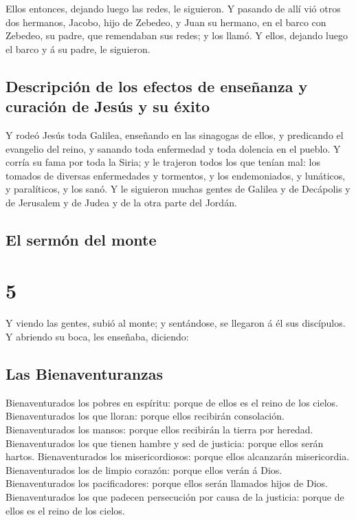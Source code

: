  Ellos entonces, dejando luego las redes, le siguieron.
 Y pasando de allí vió otros dos hermanos, Jacobo, hijo de
Zebedeo, y Juan su hermano, en el barco con Zebedeo, su padre, que
remendaban sus redes; y los llamó.  Y ellos, dejando luego
el barco y á su padre, le siguieron.

\hypertarget{descripciuxf3n-de-los-efectos-de-enseuxf1anza-y-curaciuxf3n-de-jesuxfas-y-su-uxe9xito}{%
\subsection{Descripción de los efectos de enseñanza y curación de Jesús
y su
éxito}\label{descripciuxf3n-de-los-efectos-de-enseuxf1anza-y-curaciuxf3n-de-jesuxfas-y-su-uxe9xito}}

 Y rodeó Jesús toda Galilea, enseñando en las sinagogas de
ellos, y predicando el evangelio del reino, y sanando toda enfermedad y
toda dolencia en el pueblo.  Y corría su fama por toda la
Siria; y le trajeron todos los que tenían mal: los tomados de diversas
enfermedades y tormentos, y los endemoniados, y lunáticos, y
paralíticos, y los sanó.  Y le siguieron muchas gentes de
Galilea y de Decápolis y de Jerusalem y de Judea y de la otra parte del
Jordán.

\hypertarget{el-sermuxf3n-del-monte}{%
\subsection{El sermón del monte}\label{el-sermuxf3n-del-monte}}

\hypertarget{section-4}{%
\section{5}\label{section-4}}

 Y viendo las gentes, subió al monte; y sentándose, se
llegaron á él sus discípulos.  Y abriendo su boca, les
enseñaba, diciendo:

\hypertarget{las-bienaventuranzas}{%
\subsection{Las Bienaventuranzas}\label{las-bienaventuranzas}}

 Bienaventurados los pobres en espíritu: porque de ellos es
el reino de los cielos.  Bienaventurados los que lloran:
porque ellos recibirán consolación.  Bienaventurados los
mansos: porque ellos recibirán la tierra por heredad. 
Bienaventurados los que tienen hambre y sed de justicia: porque ellos
serán hartos.  Bienaventurados los misericordiosos: porque
ellos alcanzarán misericordia.  Bienaventurados los de
limpio corazón: porque ellos verán á Dios.  Bienaventurados
los pacificadores: porque ellos serán llamados hijos de Dios.
 Bienaventurados los que padecen persecución por causa de
la justicia: porque de ellos es el reino de los cielos.

